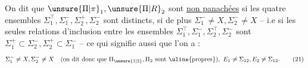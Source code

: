 \noindent\begin{minipage}[t]{.04\linewidth}
\vspace{1.2\baselineskip}
\end{minipage}\hfill\begin{minipage}[t]{.94\linewidth}
\vspace{0pt}
\uline{} On dit que $\unsure{\Pi|\pi}_1,\unsure{\Pi|R}_2$ sont \uline{ non panachées}  si les quatre ensembles $\Sigma_1^\top,\Sigma_1^-,\Sigma_2^+,\Sigma_2^-$ sont distincts,  si  de plus $\Sigma_1^-\ne X,\Sigma_2^-\ne X$ -- i.e si les seules relations d'inclusion entre les ensembles $\Sigma_1^\top,\Sigma_1^-,\Sigma_2^\top,\Sigma_2^-$ sont $\Sigma_1^+\subset\Sigma_2^-,\Sigma_2^+\subset\Sigma_1^-$ -- ce qui signifie aussi que l'on a :
\[
\Sigma_1^-\ne X,\Sigma_2^-\ne X
\quad(\text{on dit donc que }\Pi_{\unsure{1|2}},\Pi_2\text{ sont \uline{propres}}),
\ E_1\ne\Sigma_{12},E_2\ne\Sigma_{12}.
\tag*{(21)}
\]
\end{minipage}
\endgroup
\clearpage
